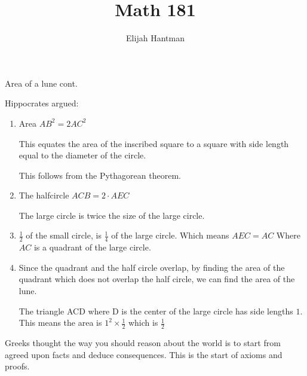 \documentclass{report}
\title{\Huge{Math 181}}
\author{\huge{Elijah Hantman}}
\date{}
\begin{document}
\maketitle
\newpage

\begin{description}
    \item Area of a lune cont. 
        \begin{mdframed}
            Hippocrates argued:
            \begin{enumerate}
                \item Area $AB^2 = 2 AC^2$ 
                    \begin{mdframed}
                        This equates the area of the
                        inscribed square to a square with
                        side length equal to the diameter
                        of the circle.

                        This follows from the Pythagorean theorem.
                    \end{mdframed}
                \item The halfcircle $ACB = 2 \cdot AEC$
                    \begin{mdframed}
                        The large circle is twice the size
                        of the large circle.
                    \end{mdframed}
                \item $\frac{1}{2}$ of the small circle, is
                    $\frac{1}{4}$ of the large circle.
                    Which means  $AEC = AC$ Where $AC$ 
                    is a quadrant of the large circle.
                \item Since the quadrant and the half circle
                    overlap, by finding the area of the
                    quadrant which does not overlap the
                    half circle, we can find the area of
                    the lune.
                    \begin{mdframed}
                        The triangle ACD where D is the
                        center of the large circle has side
                        lengths $1$. This means the 
                        area is  $1^2 \times \frac{1}{2}$
                        which is $\frac{1}{2}$
                    \end{mdframed}
            \end{enumerate}
            Greeks thought the way you should reason about the world
            is to start from agreed upon facts and deduce consequences.
            This is the start of axioms and proofs.


\end{mdframed}
\end{description}
\end{document}

